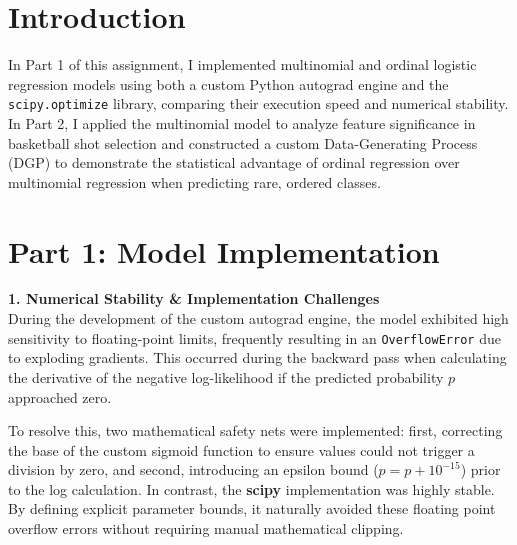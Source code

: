 \documentclass[fleqn,moreauthors,10pt]{ds_report}
\affiliation{\textit{dn98183@student.uni-lj.si}}
\begin{document}
\flushbottom

\maketitle

\thispagestyle{empty}


\section*{Introduction}
In Part 1 of this assignment, I implemented multinomial and ordinal logistic regression models using both 
a custom Python autograd engine and the \texttt{scipy.optimize} library, comparing their execution speed 
and numerical stability. 
\vspace{0.2cm}
\\
In Part 2, I applied the multinomial model to analyze feature significance in basketball shot selection 
and constructed a custom Data-Generating Process (DGP) to demonstrate the statistical advantage of 
ordinal regression over multinomial regression when predicting rare, ordered classes.


\section*{Part 1: Model Implementation}
\textbf{1. Numerical Stability \& Implementation Challenges}\\
During the development of the custom autograd engine, the model exhibited high sensitivity to floating-point 
limits, frequently resulting in an \texttt{OverflowError} due to exploding gradients. This occurred during 
the backward pass when calculating the derivative of the negative log-likelihood if the predicted 
probability $p$ approached zero. 

To resolve this, two mathematical safety nets were implemented: first, correcting the base of the custom 
sigmoid function to ensure values could not trigger a division by zero, and second, introducing an epsilon 
bound ($p = p + 10^{-15}$) prior to the log calculation. In contrast, the \textbf{scipy} implementation was 
highly stable. By defining explicit parameter bounds, it naturally avoided these floating point overflow 
errors without requiring manual mathematical clipping.
\vspace{0.3cm}
\end{document}
